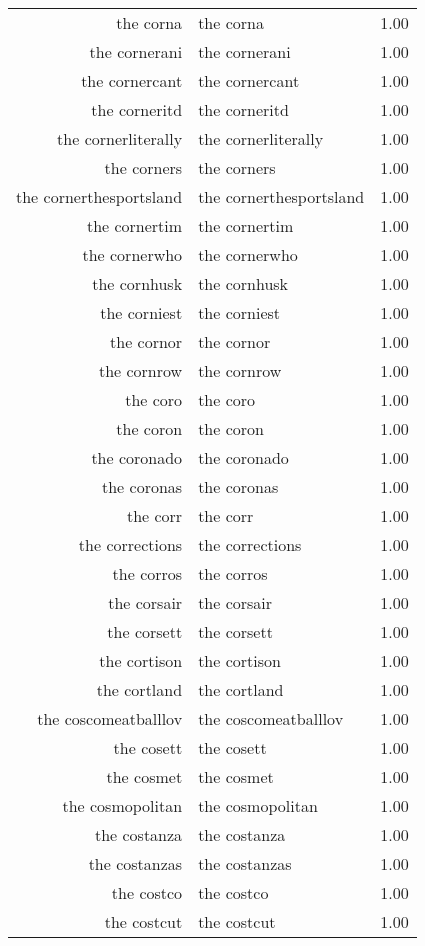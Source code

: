\begin{table}[ht]
\begin{tabular}{rlr}
  the corna & the corna & 1.00 \\ 
  the cornerani & the cornerani & 1.00 \\ 
  the cornercant & the cornercant & 1.00 \\ 
  the corneritd & the corneritd & 1.00 \\ 
  the cornerliterally & the cornerliterally & 1.00 \\ 
  the corners & the corners & 1.00 \\ 
  the cornerthesportsland & the cornerthesportsland & 1.00 \\ 
  the cornertim & the cornertim & 1.00 \\ 
  the cornerwho & the cornerwho & 1.00 \\ 
  the cornhusk & the cornhusk & 1.00 \\ 
  the corniest & the corniest & 1.00 \\ 
  the cornor & the cornor & 1.00 \\ 
  the cornrow & the cornrow & 1.00 \\ 
  the coro & the coro & 1.00 \\ 
  the coron & the coron & 1.00 \\ 
  the coronado & the coronado & 1.00 \\ 
  the coronas & the coronas & 1.00 \\ 
  the corr & the corr & 1.00 \\ 
  the corrections & the corrections & 1.00 \\ 
  the corros & the corros & 1.00 \\ 
  the corsair & the corsair & 1.00 \\ 
  the corsett & the corsett & 1.00 \\ 
  the cortison & the cortison & 1.00 \\ 
  the cortland & the cortland & 1.00 \\ 
  the coscomeatballlov & the coscomeatballlov & 1.00 \\ 
  the cosett & the cosett & 1.00 \\ 
  the cosmet & the cosmet & 1.00 \\ 
  the cosmopolitan & the cosmopolitan & 1.00 \\ 
  the costanza & the costanza & 1.00 \\ 
  the costanzas & the costanzas & 1.00 \\ 
  the costco & the costco & 1.00 \\ 
  the costcut & the costcut & 1.00 \\ 

\end{tabular}
\end{table}

